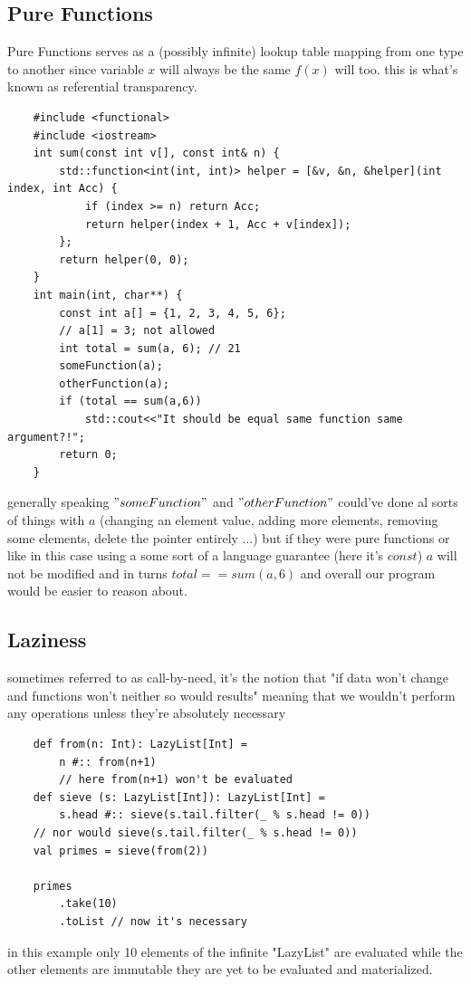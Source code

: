 \documentclass[12pt,twoside]{article}
\begin{document}
\subsection{Pure Functions}
Pure Functions serves as a (possibly infinite) lookup table mapping from one type to another since variable $x$ will always be the same $f(x)$ will too. this is what's known as referential transparency.
\lstset{style=cpp}
\begin{lstlisting}
    #include <functional>
    #include <iostream>
    int sum(const int v[], const int& n) {
        std::function<int(int, int)> helper = [&v, &n, &helper](int index, int Acc) {
            if (index >= n) return Acc;
            return helper(index + 1, Acc + v[index]);
        };
        return helper(0, 0);
    }
    int main(int, char**) {
        const int a[] = {1, 2, 3, 4, 5, 6};
        // a[1] = 3; not allowed
        int total = sum(a, 6); // 21
        someFunction(a);
        otherFunction(a);
        if (total == sum(a,6))
            std::cout<<"It should be equal same function same argument?!";
        return 0;
    }
\end{lstlisting}
generally speaking $"someFunction"$ and $"otherFunction"$ could've done al sorts of things with $a$ (changing an element value, adding more elements, removing some elements, delete the pointer entirely ...) but if they were pure functions or like in this case using a some sort of a language guarantee (here it's $const$) $a$ will not be modified and in turns $total == sum(a,6)$ and overall our program would be easier to reason about.

\subsection{Laziness}
sometimes referred to as call-by-need, it's the notion that "if data won't change and functions won't neither so would results" meaning that we wouldn't perform any operations unless they're absolutely necessary 
\lstset{style=scala}
\begin{lstlisting}
    def from(n: Int): LazyList[Int] = 
        n #:: from(n+1) 
        // here from(n+1) won't be evaluated
    def sieve (s: LazyList[Int]): LazyList[Int] = 
        s.head #:: sieve(s.tail.filter(_ % s.head != 0)) 
    // nor would sieve(s.tail.filter(_ % s.head != 0))
    val primes = sieve(from(2))

    primes
        .take(10)
        .toList // now it's necessary

\end{lstlisting}
in this example only 10 elements of the infinite "LazyList" are evaluated while the other elements are immutable they are yet to be evaluated and materialized.
\end{document}
